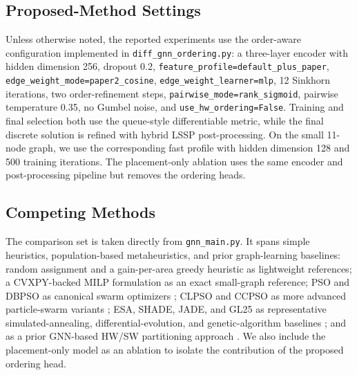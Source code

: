 \subsection{Proposed-Method Settings}
Unless otherwise noted, the reported \diffgnnorder experiments use the order-aware configuration implemented in \texttt{diff\_gnn\_ordering.py}: a three-layer \gcn encoder with hidden dimension 256, dropout 0.2, \texttt{feature\_profile=default\_plus\_paper}, \texttt{edge\_weight\_mode=paper2\_cosine}, \texttt{edge\_weight\_learner=mlp}, 12 Sinkhorn iterations, two order-refinement steps, \texttt{pairwise\_mode=rank\_sigmoid}, pairwise temperature 0.35, no Gumbel noise, and \texttt{use\_hw\_ordering=False}. Training and final selection both use the queue-style differentiable metric, while the final discrete solution is refined with hybrid LSSP post-processing. On the small 11-node graph, we use the corresponding fast profile with hidden dimension 128 and 500 training iterations. The placement-only \diffgnn ablation uses the same encoder and post-processing pipeline but removes the ordering heads.

\subsection{Competing Methods}
The comparison set is taken directly from \texttt{gnn\_main.py}. It spans simple heuristics, population-based metaheuristics, and prior graph-learning baselines: random assignment and a gain-per-area greedy heuristic as lightweight references; a CVXPY-backed MILP formulation as an exact small-graph reference; PSO and DBPSO as canonical swarm optimizers \cite{kennedy1995particle,kennedy1997discrete}; CLPSO and CCPSO as more advanced particle-swarm variants \cite{liang2006comprehensive,li2011cooperatively}; ESA, SHADE, JADE, and GL25 as representative simulated-annealing, differential-evolution, and genetic-algorithm baselines \cite{siarry1997enhanced,tanabe2013success,zhang2009jade,garcia2008global}; and \gcps as a prior GNN-based HW/SW partitioning approach \cite{zheng2021hardware}. We also include the placement-only \diffgnn model as an ablation to isolate the contribution of the proposed ordering head.

